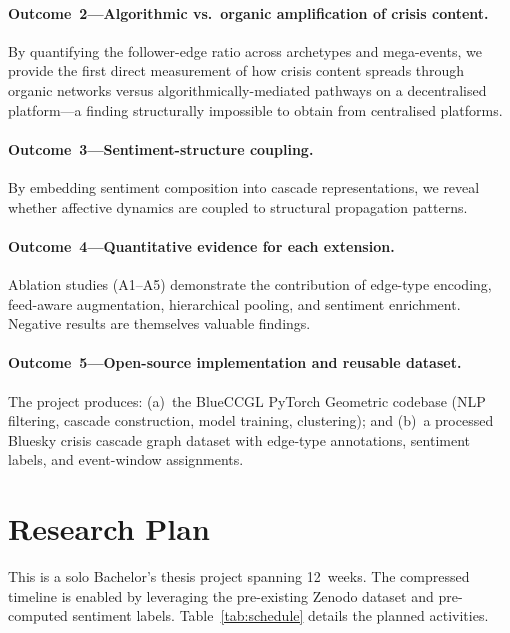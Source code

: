 \documentclass[12pt,a4paper]{article}
\begin{document}
\paragraph{Outcome~2---Algorithmic vs.\ organic amplification of crisis content.}
By quantifying the follower-edge ratio across archetypes and mega-events, we
provide the first direct measurement of how crisis content spreads through
organic networks versus algorithmically-mediated pathways on a decentralised
platform---a finding structurally impossible to obtain from centralised
platforms.

\paragraph{Outcome~3---Sentiment-structure coupling.}
By embedding sentiment composition into cascade representations, we reveal
whether affective dynamics are coupled to structural propagation patterns.

\paragraph{Outcome~4---Quantitative evidence for each extension.}
Ablation studies (A1--A5) demonstrate the contribution of edge-type encoding,
feed-aware augmentation, hierarchical pooling, and sentiment enrichment.
Negative results are themselves valuable findings.

\paragraph{Outcome~5---Open-source implementation and reusable dataset.}
The project produces: (a)~the BlueCCGL PyTorch Geometric codebase (NLP
filtering, cascade construction, model training, clustering); and (b)~a
processed Bluesky crisis cascade graph dataset with edge-type annotations,
sentiment labels, and event-window assignments.

\section{Research Plan}

This is a solo Bachelor's thesis project spanning 12~weeks.  The compressed
timeline is enabled by leveraging the pre-existing Zenodo dataset and
pre-computed sentiment labels.
Table~\ref{tab:schedule} details the planned activities.
\end{document}

